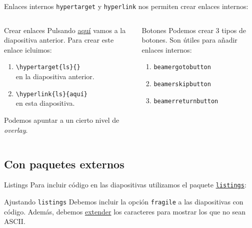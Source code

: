 \begin{frame}{Enlaces internos}
  \texttt{hypertarget} y \texttt{hyperlink} nos permiten crear enlaces internos:
  \espacio
  \begin{columns}
      \pause
      \begin{exampleblock}{Crear enlaces}
        Pulsando \hyperlink{ls}{\color{links}aquí} vamos a la diapositiva anterior. Para
        crear este enlace icluimos:
        \begin{enumerate}
          \item \texttt{\textbackslash {\color{keywords}hypertarget}\{ls\}\{\}} \\
          en la diapositiva anterior.
          \item \texttt{\textbackslash {\color{keywords}hyperlink}\{ls\}\{aquí\}} \\
          en esta diapositiva.
        \end{enumerate}

        Podemos apuntar a un cierto nivel de \textit{overlay}.
      \end{exampleblock}
      \pause
      \begin{exampleblock}{Botones}
        Podemos crear 3 tipos de botones. Son útiles para añadir enlaces internos:
        \begin{enumerate}
          \item \texttt{beamergotobutton}   \\ \hyperlink{graphs}{}
          \item \texttt{beamerskipbutton}   \\ \hyperlink{end}{}
          \item \texttt{beamerreturnbutton} \\ \hyperlink{index}{}
        \end{enumerate}
      \end{exampleblock}
  \end{columns}
\end{frame}

\subsection{Con paquetes externos}

\begin{frame}{Listings}
  \hypertarget{ls}{}
  Para incluir código en las diapositivas utilizamos el paquete
  \href{https://www.ctan.org/tex-archive/macros/latex/contrib/listings}{\texttt{listings}}:
  \espacio
  \espacio
  \pause
  \begin{alertblock}{Ajustando \texttt{listings}}
    Debemos incluir la opción \texttt{fragile} a las diapositivas con código.
    Además, debemos \href{http://tex.stackexchange.com/questions/24528}{extender}
    los caracteres para mostrar los que no sean ASCII.
  \end{alertblock}
\end{frame}


